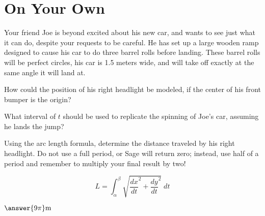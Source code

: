 \documentclass{ximera}
\begin{document}
\section{On Your Own}
\begin{question}
\item Your friend Joe is beyond excited about his new car, and wants to see just what it can do, despite your requests to be careful. He has set up a large wooden ramp designed to cause his car to do three barrel rolls before landing. These barrel rolls will be perfect circles, his car is 1.5 meters wide, and will take off exactly at the same angle it will land at.

How could the position of his right headlight be modeled, if the center of his front bumper is the origin?

\begin{multipleChoice}
\end{multipleChoice}

What interval of $t$ should be used to replicate the spinning of Joe's car, assuming he lands the jump?

\begin{multipleChoice}
\end{multipleChoice}

Using the arc length formula, determine the distance traveled by his right headlight. Do not use a full period, or Sage will return zero; instead, use half of a period and remember to multiply your final result by two!

$$L = \int_\alpha^\beta \sqrt{\dfrac{dx}{dt}^2 + \dfrac{dy}{dt}^2} \;dt$$

\begin{onlineOnly}
\begin{sageCell}

\end{sageCell}
\end{onlineOnly}
\begin{center}
$\answer{9\pi}\text{m}$
\end{center}
\end{question}
\end{document}
